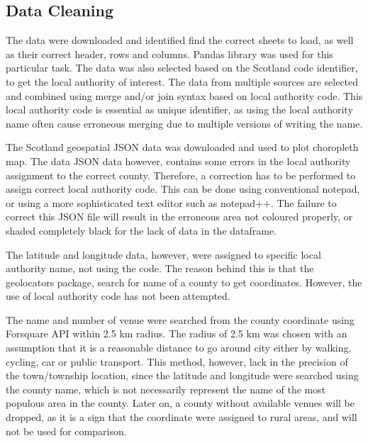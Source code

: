 \documentclass{homeworg}
\begin{document}
\subsection{Data Cleaning}
The data were downloaded and identified find the correct sheets to load, as well as their correct header, rows and columns. Pandas library was used for this particular task. The data was also selected based on the Scotland code identifier, to get the local authority of interest. The data from multiple sources are selected and combined using merge and/or join syntax based on local authority code. This local authority code is essential as unique identifier, as using the local authority name often cause erroneous merging due to multiple versions of writing the name. \par
The Scotland geospatial JSON data was downloaded and used to plot choropleth map. The data JSON data however, contains some errors in the local authority assignment to the correct county. Therefore, a correction has to be performed to assign correct local authority code. This can be done using conventional notepad, or using a more sophisticated text editor such as notepad++. The failure to correct this JSON file will result in the erroneous area not coloured properly, or shaded completely black for the lack of data in the dataframe.\par
The latitude and longitude data, however, were assigned to specific local authority name, not using the code. The reason behind this is that the geolocators package, search for name of a county to get coordinates. However, the use of local authority code has not been attempted. \par
The name and number of venue were searched from the county coordinate using Forsquare API within 2.5 km radius. The radius of 2.5 km was chosen with an assumption that it is a reasonable distance to go around city either by walking, cycling, car or public transport. This method, however, lack in the precision of the town/township location, since the latitude and longitude were searched using the county name, which is not necessarily represent the name of the most populous area in the county. Later on, a county without available venues will be dropped, as it is a sign that the coordinate were assigned to rural areas, and will not be used for comparison.
\end{document}
